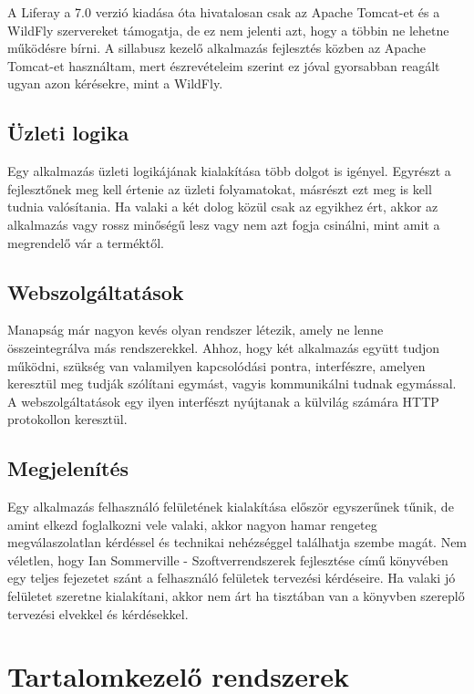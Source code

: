 \documentclass[hidelinks, 12pt, a4paper]{report}
\begin{document}
A Liferay a 7.0 verzió kiadása óta hivatalosan csak az Apache Tomcat-et és a WildFly szervereket támogatja, de ez nem jelenti azt, hogy a többin ne lehetne működésre bírni. A sillabusz kezelő alkalmazás fejlesztés közben az Apache Tomcat-et használtam, mert észrevételeim szerint ez jóval gyorsabban reagált ugyan azon kérésekre, mint a WildFly.

\subsection{Üzleti logika}

Egy alkalmazás üzleti logikájának kialakítása több dolgot is igényel. Egyrészt a fejlesztőnek meg kell értenie az üzleti folyamatokat, másrészt ezt meg is kell tudnia valósítania. Ha valaki a két dolog közül csak az egyikhez ért, akkor az alkalmazás vagy rossz minőségű lesz vagy nem azt fogja csinálni, mint amit a megrendelő vár a terméktől.

\subsection{Webszolgáltatások}

Manapság már nagyon kevés olyan rendszer létezik, amely ne lenne összeintegrálva más rendszerekkel. Ahhoz, hogy két alkalmazás együtt tudjon működni, szükség van valamilyen kapcsolódási pontra, interfészre, amelyen keresztül meg tudják szólítani egymást, vagyis kommunikálni tudnak egymással. A webszolgáltatások egy ilyen interfészt nyújtanak a külvilág számára HTTP protokollon keresztül.

\subsection{Megjelenítés}

Egy alkalmazás felhasználó felületének kialakítása először egyszerűnek tűnik, de amint elkezd foglalkozni vele valaki, akkor nagyon hamar rengeteg megválaszolatlan kérdéssel és technikai nehézséggel találhatja szembe magát. Nem véletlen, hogy Ian Sommerville - Szoftverrendszerek fejlesztése című \cite{szoftverrendszerek-fejlesztese} könyvében egy teljes fejezetet szánt a felhasználó felületek tervezési kérdéseire. Ha valaki jó felületet szeretne kialakítani, akkor nem árt ha tisztában van a könyvben szereplő tervezési elvekkel és kérdésekkel.

\section{Tartalomkezelő rendszerek}
\end{document}
